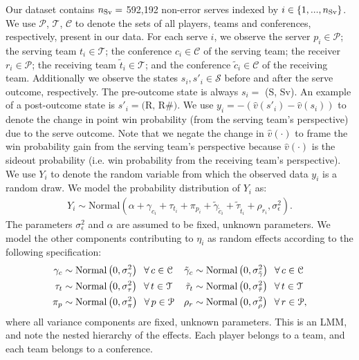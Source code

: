 \documentclass[USenglish]{article}
\theoremstyle{dgthm}
\theoremstyle{dgdef}
\begin{document}
Our dataset contains $n_{\mbox{\scriptsize Sv}} =$ 592,192 non-error serves indexed by $i \in \{1, ..., n_{\mbox{\scriptsize Sv}}\}$. We use $\mathcal{P}$, $\mathcal{T}$, $\mathcal{C}$ to denote the sets of all players, teams and conferences, respectively, present in our data. For each serve $i$, we observe the server $p_i \in \mathcal{P}$; the serving team $t_i \in \mathcal{T}$; the conference $c_i \in \mathcal{C}$ of the serving team; the receiver $r_i \in \mathcal{P}$; the receiving team $\tilde t_i \in \mathcal{T}$; and the conference $\tilde c_i \in \mathcal{C}$ of the receiving team. Additionally we observe the states $s_i, s'_i \in \mathcal{S}$ before and after the serve outcome, respectively. The pre-outcome state is always $s_i =$ (S, Sv). An example of a post-outcome state is $s'_i = \mbox{(R, R\#)}$. We use $y_i = -(\hat v(s'_i) - \hat v(s_i))$ to denote the change in point win probability (from the serving team's perspective) due to the serve outcome. Note that we negate the change in $\hat v(\cdot)$ to frame the win probability gain from the serving team's perspective because $\hat v(\cdot)$ is the sideout probability (i.e. win probability from the receiving team's perspective). We use $Y_i$ to denote the random variable from which the observed data $y_i$ is a random draw. We model the probability distribution of $Y_i$ as:
\begin{align}
  \label{eqn:serve-model}
  Y_i \sim \mbox{Normal}(\alpha + \gamma_{c_i} + \tau_{t_i} + \pi_{p_i} + \tilde\gamma_{\tilde c_i} + \tilde\tau_{\tilde t_i} + \rho_{r_i}, \sigma^2_\epsilon).
\end{align}
The parameters $\sigma^2_\epsilon$ and $\alpha$ are assumed to be fixed, unknown parameters. We model the other components contributing to $\eta_i$ as random effects according to the following specification:
\begin{align*}
  \gamma_c &\sim \mbox{Normal}\left(0, \sigma^2_\gamma\right) \hspace{2mm} \forall\, c \in \mathcal{C} &
  \tilde\gamma_c &\sim \mbox{Normal}\left(0, \sigma^2_{\tilde\gamma}\right) \hspace{2mm} \forall\, c \in \mathcal{C} \\
  \tau_t &\sim \mbox{Normal}\left(0, \sigma^2_\tau\right) \hspace{2mm} \forall\, t \in \mathcal{T} &
  \tilde\tau_t &\sim \mbox{Normal}\left(0, \sigma^2_{\tilde\tau}\right) \hspace{2mm} \forall\, t \in \mathcal{T} \\
  \pi_p &\sim \mbox{Normal}\left(0, \sigma^2_\pi\right) \hspace{2mm} \forall\, p \in \mathcal{P} &
  \rho_r &\sim \mbox{Normal}\left(0, \sigma^2_\rho\right) \hspace{2mm} \forall\, r \in \mathcal{P},
\end{align*}
where all variance components are fixed, unknown parameters. This is an LMM, and note the nested hierarchy of the effects. Each player belongs to a team, and each team belongs to a conference.
\end{document}
